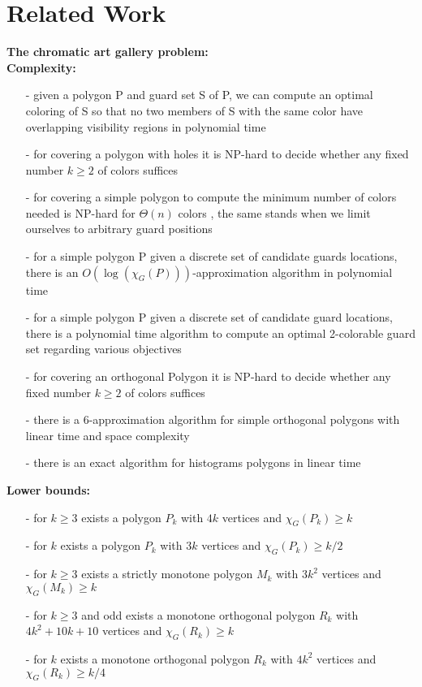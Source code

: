 \section{Related Work}
\textbf{The chromatic art gallery problem:} \\
\textbf{Complexity:}
\begin{enumerate}
    \item[-] given a polygon P and guard set S of P, we can compute an optimal coloring of S so that no two members of S with the same color have overlapping visibility regions in polynomial time \cite{erickson2011many}
    \item[-] for covering a polygon with holes it is NP-hard to decide whether any fixed number $k \geq 2$ of colors suffices \cite{fekete2014complexity}
    \item[-] for covering a simple polygon to compute the minimum number of colors needed is NP-hard for $\Theta(n)$ colors \cite{fekete2014complexity},
    the same stands when we limit ourselves to arbitrary guard positions \cite{fekete2014chromatic} 
    \item[-] for a simple polygon P given a discrete set of candidate guards locations, there is an $O(\log (\chi_G(P)))$-approximation algorithm in polynomial time \cite{fekete2014chromatic}
    \item[-] for a simple polygon P given a discrete set of candidate guard locations, there is a polynomial time algorithm to compute an optimal 2-colorable guard set regarding various objectives \cite{fekete2014chromatic} 
    \item[-] for covering an orthogonal Polygon it is NP-hard to decide whether any fixed number $k \geq 2$ of colors suffices \cite{hoorfar2021np}
    \item[-] there is a 6-approximation algorithm for simple orthogonal polygons with linear time and space complexity \cite{hoorfar2021np}
    \item[-] there is an exact algorithm for histograms polygons in linear time \cite{hoorfar2021np}
\end{enumerate}
\textbf{Lower bounds:}
\begin{enumerate}
    \item[-] for $k \geq 3$ exists a polygon $P_k$ with $4k$ vertices and $\chi_G(P_k) \geq k$ \cite{erickson2012art}
    \item[-] for $k$ exists a polygon $P_k$ with $3k$ vertices and $\chi_G(P_k) \geq k/2$ \cite{bartschi2011coloring}
    \item[-] for $k \geq 3$ exists a strictly monotone polygon $M_k$ with $3k^2$ vertices and $\chi_G(M_k) \geq k$ \cite{erickson2012art}
    \item[-] for $k \geq 3$ and odd exists a monotone orthogonal polygon $R_k$ with $4k^2 + 10k + 10$ vertices and $\chi_G(R_k) \geq k$ \cite{erickson2012art}
    \item[-] for $k$ exists a monotone orthogonal polygon $R_k$ with $4k^2$ vertices and $\chi_G(R_k) \geq k/4$ \cite{bartschi2011coloring}
\end{enumerate}
